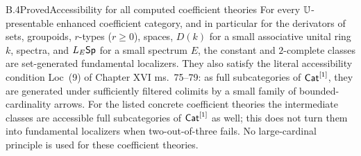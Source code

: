 \begin{claim}{B.4}{Proved}{Accessibility for all computed coefficient theories}
For every $\mathbb U$-presentable enhanced coefficient category, and in
particular for the derivators of sets, groupoids, $r$-types ($r\geq0$), spaces,
$D(k)$ for a small associative unital ring $k$, spectra, and $L_E\mathsf{Sp}$
for a small spectrum $E$, the constant and $2$-complete classes are
set-generated fundamental localizers. They also satisfy the literal
accessibility condition Loc~(9) of Chapter XVI ms.~75--79: as full
subcategories of $\mathsf{Cat}^{[1]}$, they are generated under sufficiently
filtered colimits by a small family of bounded-cardinality arrows.
For the listed concrete coefficient theories the intermediate
classes are accessible full subcategories of
$\mathsf{Cat}^{[1]}$ as well; this does not turn them into fundamental
localizers when two-out-of-three fails. No large-cardinal principle
is used for these coefficient theories.
\end{claim}
